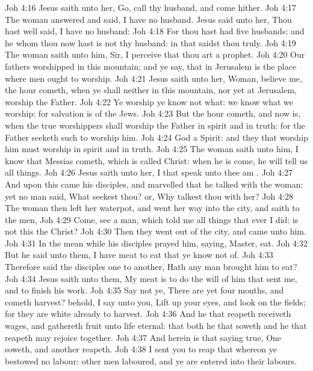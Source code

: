 \vs Joh 4:16 Jesus saith unto her, Go, call thy husband, and come hither.
\vs Joh 4:17 The woman answered and said, I have no husband. Jesus said unto her, Thou hast well said, I have no husband:
\vs Joh 4:18 For thou hast had five husbands; and he whom thou now hast is not thy husband: in that saidst thou truly.
\vs Joh 4:19 The woman saith unto him, Sir, I perceive that thou art a prophet.
\vs Joh 4:20 Our fathers worshipped in this mountain; and ye say, that in Jerusalem is the place where men ought to worship.
\vs Joh 4:21 Jesus saith unto her, Woman, believe me, the hour cometh, when ye shall neither in this mountain, nor yet at Jerusalem, worship the Father.
\vs Joh 4:22 Ye worship ye know not what: we know what we worship: for salvation is of the Jews.
\vs Joh 4:23 But the hour cometh, and now is, when the true worshippers shall worship the Father in spirit and in truth: for the Father seeketh such to worship him.
\vs Joh 4:24 God  a Spirit: and they that worship him must worship  in spirit and in truth.
\vs Joh 4:25 The woman saith unto him, I know that Messias cometh, which is called Christ: when he is come, he will tell us all things.
\vs Joh 4:26 Jesus saith unto her, I that speak unto thee am .
\vs Joh 4:27 And upon this came his disciples, and marvelled that he talked with the woman: yet no man said, What seekest thou? or, Why talkest thou with her?
\vs Joh 4:28 The woman then left her waterpot, and went her way into the city, and saith to the men,
\vs Joh 4:29 Come, see a man, which told me all things that ever I did: is not this the Christ?
\vs Joh 4:30 Then they went out of the city, and came unto him.
\vs Joh 4:31 In the mean while his disciples prayed him, saying, Master, eat.
\vs Joh 4:32 But he said unto them, I have meat to eat that ye know not of.
\vs Joh 4:33 Therefore said the disciples one to another, Hath any man brought him  to eat?
\vs Joh 4:34 Jesus saith unto them, My meat is to do the will of him that sent me, and to finish his work.
\vs Joh 4:35 Say not ye, There are yet four months, and  cometh harvest? behold, I say unto you, Lift up your eyes, and look on the fields; for they are white already to harvest.
\vs Joh 4:36 And he that reapeth receiveth wages, and gathereth fruit unto life eternal: that both he that soweth and he that reapeth may rejoice together.
\vs Joh 4:37 And herein is that saying true, One soweth, and another reapeth.
\vs Joh 4:38 I sent you to reap that whereon ye bestowed no labour: other men laboured, and ye are entered into their labours.
